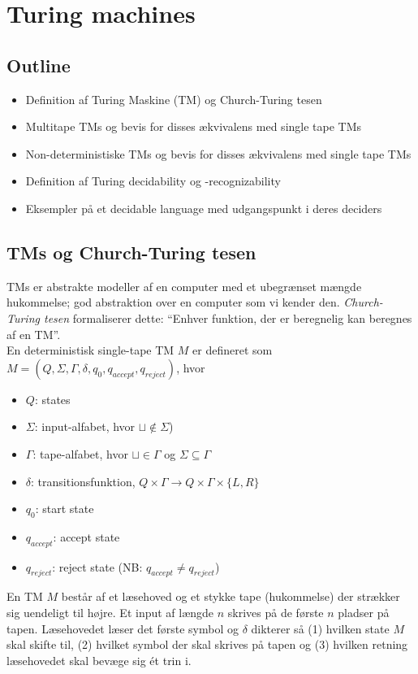 \section{Turing machines}

\subsection*{Outline}

\begin{itemize}
	\item Definition af Turing Maskine (TM) og Church-Turing tesen
	\item Multitape TMs og bevis for disses ækvivalens med single tape TMs
	\item Non-deterministiske TMs og bevis for disses ækvivalens med single tape TMs
	\item Definition af Turing decidability og -recognizability
	\item Eksempler på et decidable language med udgangspunkt i deres deciders
\end{itemize}

\subsection*{TMs og Church-Turing tesen}

TMs er abstrakte modeller af en computer med et ubegrænset mængde hukommelse; god abstraktion over en computer som vi kender den. \textit{Church-Turing tesen} formaliserer dette: ``Enhver funktion, der er beregnelig kan beregnes af en TM''. \\

En deterministisk single-tape TM $M$ er defineret som $M=(Q,\Sigma,\Gamma,\delta,q_0,q_{accept},q_{reject})$, hvor
\begin{itemize}
	\item $Q$: states
	\item $\Sigma$: input-alfabet, hvor $\sqcup \notin \Sigma$) 
	\item $\Gamma$: tape-alfabet, hvor $\sqcup \in \Gamma$ og $\Sigma \subseteq \Gamma$
	\item  $\delta$: transitionsfunktion, $Q \times \Gamma \rightarrow Q \times \Gamma \times \{L,R\}$
	\item $q_0$: start state
	\item $q_{accept}$: accept state
	\item $q_{reject}$: reject state (NB: $q_{accept} \ne q_{reject}$)
\end{itemize} 
En TM $M$ består af et læsehoved og et stykke tape (hukommelse) der strækker sig uendeligt til højre. Et input af længde $n$ skrives på de første $n$ pladser på tapen. Læsehovedet læser det første symbol og $\delta$ dikterer så (1) hvilken state $M$ skal skifte til, (2) hvilket symbol der skal skrives på tapen og (3) hvilken retning læsehovedet skal bevæge sig ét trin i. \\

